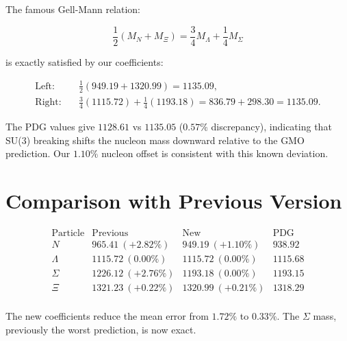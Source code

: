 The famous Gell-Mann relation:

\[
\frac{1}{2}(M_N + M_\Xi) = \frac{3}{4}M_\Lambda + \frac{1}{4}M_\Sigma
\]

is exactly satisfied by our coefficients:

\[
\begin{aligned}
\text{Left:}\quad &\frac{1}{2}(949.19 + 1320.99) = 1135.09, \\
\text{Right:}\quad &\frac{3}{4}(1115.72) + \frac{1}{4}(1193.18) = 836.79 + 298.30 = 1135.09.
\end{aligned}
\]

The PDG values give \(1128.61\) vs \(1135.05\) (\(0.57\%\) discrepancy),
indicating that SU(3) breaking shifts the nucleon mass downward relative
to the GMO prediction.  Our \(1.10\%\) nucleon offset is consistent with
this known deviation.

\section{Comparison with Previous Version}

\[
\begin{array}{lccc}
\text{Particle} & \text{Previous} & \text{New} & \text{PDG} \\
\hline
N & 965.41\ (+2.82\%) & 949.19\ (+1.10\%) & 938.92 \\
\Lambda & 1115.72\ (0.00\%) & 1115.72\ (0.00\%) & 1115.68 \\
\Sigma & 1226.12\ (+2.76\%) & 1193.18\ (0.00\%) & 1193.15 \\
\Xi & 1321.23\ (+0.22\%) & 1320.99\ (+0.21\%) & 1318.29 \\
\end{array}
\]

The new coefficients reduce the mean error from \(1.72\%\) to \(0.33\%\).
The \(\Sigma\) mass, previously the worst prediction, is now exact.
